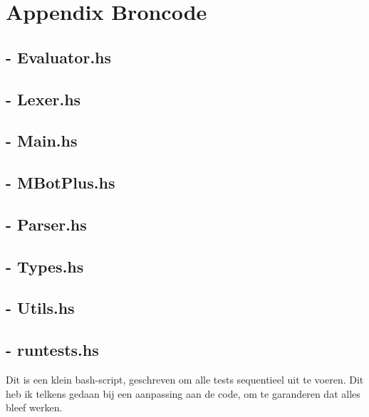 \documentclass[12pt,a4paper]{report}
\begin{document}
\chapter{Appendix Broncode}

\section{- Evaluator.hs}

\newpage
\section{- Lexer.hs}

\newpage
\section{- Main.hs}

\newpage
\section{- MBotPlus.hs}

\newpage
\section{- Parser.hs}

\newpage
\section{- Types.hs}

\newpage
\section{- Utils.hs}

\section{- runtests.hs}
Dit is een klein bash-script, geschreven om alle tests sequentieel uit te voeren. Dit heb ik telkens gedaan bij een aanpassing aan de code, om te garanderen dat alles bleef werken.

\end{document}
